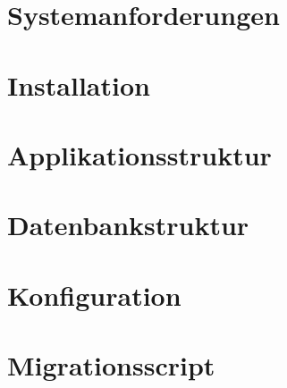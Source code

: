 \documentclass[12pt, letterpaper]{report}
\begin{document}
    \chapter{Systemanforderungen}
    

    \chapter{Installation}
    

    \chapter{Applikationsstruktur}
    

    \chapter{Datenbankstruktur}
    

    \chapter{Konfiguration}


    \chapter{Migrationsscript}
    
\end{document}
